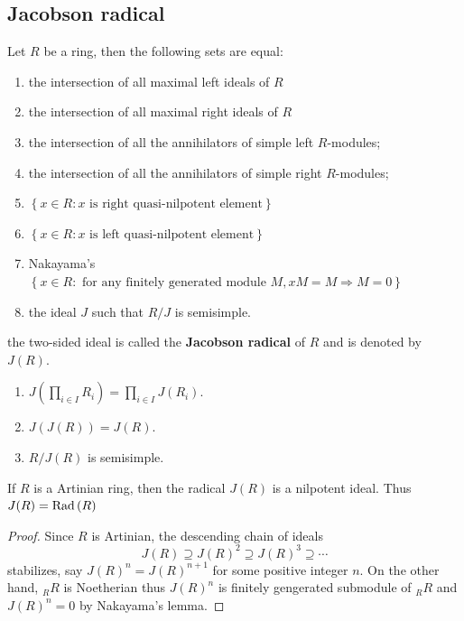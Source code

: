\subsection{Jacobson radical}
\begin{theorem}
    \label{thm: Jacobson radical}
    Let $R$ be a ring, then the following sets are equal:
    \begin{enumerate}
        \item
              the intersection of all maximal left ideals of $R$
        \item [1']
              the intersection of all maximal right ideals of $R$

        \item
              the intersection of all the annihilators of simple left $R$-modules;
        \item [2']
              the intersection of all the annihilators of simple right $R$-modules;
        \item
              $\left\{x\in R: x \text{ is right quasi-nilpotent element}\right\}$
        \item [3']
              $\left\{x\in R: x \text{ is left quasi-nilpotent element}\right\}$
        \item
              Nakayama's
              $\left\{x\in R: \text{ for any finitely generated module } M, xM=M\Rightarrow M=0\right\}$
        \item
              the ideal $J$ such that $R/J$ is semisimple.
    \end{enumerate}
    the two-sided ideal is called the \textbf{Jacobson radical} of $R$ and is denoted by $J(R)$.
\end{theorem}


\begin{corollary}
    \begin{enumerate}
        \item
              $J\left(\prod_{i \in I} R_i\right)=\prod_{i \in I} J\left(R_i\right)$.
        \item
              $J\left(J\left(R\right)\right)=J\left(R\right)$.
        \item
              $R/J(R)$ is semisimple.
    \end{enumerate}
\end{corollary}

\begin{proposition}
    If $R$ is a Artinian ring, then the radical $J(R)$ is a nilpotent ideal.
    Thus $J(R)=\operatorname{\operatorname{Rad}}\left( R \right)$
    \begin{proof}
        Since $R$ is Artinian, the descending chain of ideals
        \begin{equation*}
            J(R) \supseteq J(R)^2 \supseteq J(R)^3 \supseteq \cdots
        \end{equation*}
        stabilizes, say $J(R)^n=J(R)^{n+1}$ for some positive integer $n$.
        On the other hand, ${}_R R$ is Noetherian thus $J(R)^n$ is finitely gengerated submodule of ${}_R R$ and $J(R)^n =0$ by Nakayama's lemma.
    \end{proof}
\end{proposition}




